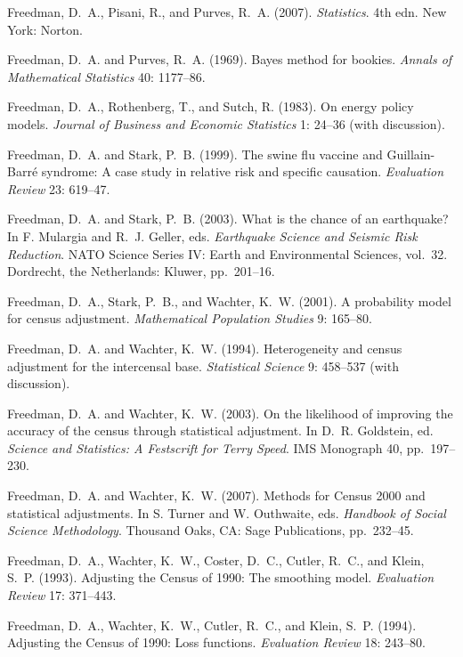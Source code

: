 \smallskip\noindent
Freedman, D.~A., Pisani, R., and Purves, R.~A. (2007).
{\it Statistics\/}. 4th edn.
New York: Norton.

\smallskip\noindent
Freedman, D.~A. and Purves, R.~A. (1969).
Bayes method for bookies.
{\it Annals of Mathematical Statistics\/} 40: 1177--86.

\smallskip\noindent
Freedman, D.~A., Rothenberg, T., and Sutch, R. (1983).
On energy policy models.
{\it Journal of Business and Economic Statistics\/} 1: 24--36 (with discussion).

\smallskip\noindent
Freedman, D.~A. and Stark, P.~B. (1999).
The swine flu vaccine and Guillain-Barr\'e syndrome:
A case study in relative risk and specific causation.
{\it Evaluation Review\/} 23: 619--47.

\smallskip\noindent
Freedman, D.~A. and Stark, P.~B. (2003).
What is the chance of an earthquake?
In F. Mulargia and R.~J. Geller, eds.
{\it Earthquake Science and Seismic Risk Reduction\/}.
NATO Science Series IV: Earth and Environmental Sciences, vol.~32.
Dordrecht, the Netherlands: Kluwer, pp.~201--16.

\smallskip\noindent
Freedman, D.~A., Stark, P.~B., and Wachter, K.~W. (2001).
A probability model for census adjustment.
{\it Mathematical Population Studies\/} 9: 165--80.

\smallskip\noindent
Freedman, D.~A. and Wachter, K.~W. (1994).
Heterogeneity and census adjustment for the intercensal base.
{\it Statistical Science\/} 9: 458--537 (with discussion).

\smallskip\noindent
Freedman, D.~A. and Wachter, K.~W. (2003).
On the likelihood of improving the accuracy of the census through statistical adjustment.
In D.~R. Goldstein, ed.
{\it Science and Statistics: A Festscrift for Terry Speed\/}.
IMS Monograph 40, pp.~197--230.

\smallskip\noindent
Freedman, D.~A. and Wachter, K.~W. (2007).
Methods for Census 2000 and statistical adjustments.
In S. Turner and W. Outhwaite, eds.
{\it Handbook of Social Science Methodology\/}.
Thousand Oaks, CA: Sage Publications, pp.~232--45.

\smallskip\noindent
Freedman, D.~A., Wachter, K.~W., Coster, D.~C., Cutler, R.~C., and Klein, S.~P. (1993).
Adjusting the Census of 1990: The smoothing model.
{\it Evaluation Review\/} 17: 371--443.

\smallskip\noindent
Freedman, D.~A., Wachter, K.~W., Cutler, R.~C., and Klein, S.~P. (1994).
Adjusting the Census of 1990: Loss functions.
{\it Evaluation Review\/} 18: 243--80.

